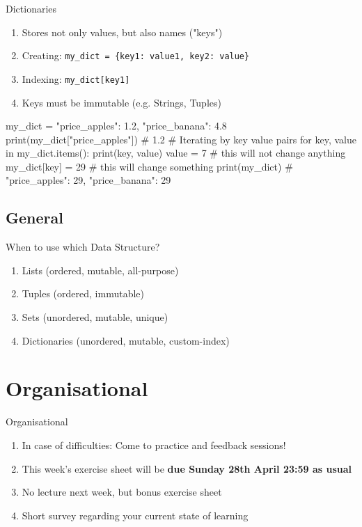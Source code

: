 \begin{frame}[fragile]{Dictionaries}

    \begin{enumerate}
		\item Stores not only values, but also names ("keys")
		\item Creating: \texttt{my\_dict = \{key1: value1, key2: value\}}
		\item Indexing: \texttt{my\_dict[key1]}
		\item Keys must be immutable (e.g. Strings, Tuples)
    \end{enumerate}

	\vspace{1em}

	\begin{pythoncode}
my_dict = {"price_apples": 1.2, "price_banana": 4.8}
print(my_dict["price_apples"]) # 1.2
# Iterating by key value pairs
for key, value in my_dict.items():
	print(key, value)
	value = 7 # this will not change anything
	my_dict[key] = 29 # this will change something
print(my_dict) # {"price_apples": 29, "price_banana": 29}

	\end{pythoncode}

\end{frame}

\subsection*{General}

\begin{frame}{When to use which Data Structure?}

    \begin{enumerate}
		\item Lists         (ordered, mutable, all-purpose)
		\item Tuples        (ordered, immutable)
		\item Sets          (unordered, mutable, unique)
		\item Dictionaries  (unordered, mutable, custom-index)
    \end{enumerate}

\end{frame}

\section{Organisational}

\begin{frame}{Organisational}

    \begin{enumerate}
		\item In case of difficulties: Come to practice and feedback sessions!
		\item This week's exercise sheet will be \textbf{due Sunday 28th April 23:59 as usual}
		\item No lecture next week, but bonus exercise sheet
		\item Short survey regarding your current state of learning
    \end{enumerate}

\end{frame}


